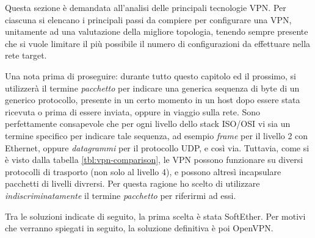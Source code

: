 Questa sezione è demandata all'analisi delle principali tecnologie VPN. Per ciascuna
si elencano i principali passi da compiere per configurare una VPN, unitamente ad una valutazione
della migliore topologia, tenendo sempre presente che si vuole limitare il più possibile
il numero di configurazioni da effettuare nella rete target.

Una nota prima di proseguire: durante tutto questo capitolo ed il prossimo, si utilizzerà
il termine \textit{pacchetto} per indicare una generica sequenza di byte di un generico
protocollo, presente in un certo momento in un host dopo essere stata ricevuta o prima
di essere inviata, oppure in viaggio sulla rete. Sono perfettamente consapevole che per
ogni livello dello stack ISO/OSI vi sia un termine specifico per indicare tale
sequenza, ad esempio \textit{frame} per il livello 2 con Ethernet, oppure \textit{datagrammi}
per il protocollo UDP, e così via. Tuttavia, come si è visto dalla tabella \ref{tbl:vpn-comparison},
le VPN possono funzionare su diversi protocolli di trasporto (non solo al livello 4),
e possono altresì incapsulare
pacchetti di livelli divrersi. Per questa ragione ho scelto di utilizzare
\textit{indiscriminatamente} il termine \textit{pacchetto} per riferirmi ad essi.


Tra le soluzioni indicate di seguito, la prima scelta è stata SoftEther. Per motivi che
verranno spiegati in seguito, la soluzione definitiva è poi OpenVPN.
